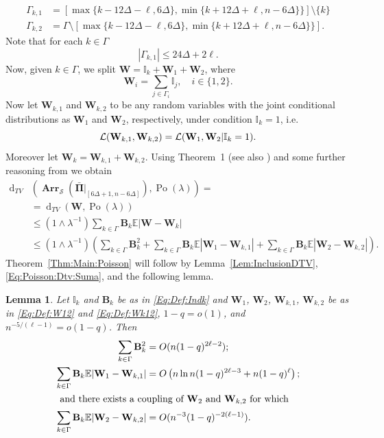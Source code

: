 \documentclass[letterpaper,11pt]{article}
\newtheorem{lemma}[theorem]{Lemma}
\theoremstyle{definition}
\theoremstyle{remark}
\renewcommand{\le}{\leqslant}
\newcommand{\bE}{\mathbb{E}}
\newcommand{\Arr}{\ensuremath{\operatorname{\mathbf{Arr}}}}
\newcommand{\bB}{\mathbf{B}}
\newcommand{\Ind}{\mathbb{I}}
\newcommand{\barPi}{\bar {\mathbf \Pi}}
\newcommand{\cS}{\mathcal{S}}
\newcommand{\dtv}{\operatorname{d}_{TV}}
\newcommand{\bW}{\mathbf{W}}
\begin{document}
\begin{align}
	\Gamma_{k,1}&=[\max\{k-12\Delta-\ell ,6\Delta\},\min\{k+12\Delta+\ell,n-6\Delta\}\}]\setminus \{k\}\nonumber \\
	\Gamma_{k,2}&=\Gamma\setminus [\max\{k-12\Delta-\ell,6\Delta\},\min\{k+12\Delta+\ell,n-6\Delta\}\}].\label{Eq:Def:Gammak}
\end{align}
Note that for each $k\in \Gamma$
\begin{equation*}
	|\Gamma_{k,1}|\le  24\Delta + 2\ell.
\end{equation*}
Now, given $k\in \Gamma$, we split $\bW=\Ind_k+\bW_1+\bW_2$, where
\begin{equation}\label{Eq:Def:W12}
	\bW_i=\sum_{j\in \Gamma_i}\Ind_j,\quad i\in \{1,2\}. 
\end{equation}
Now let $\bW_{k,1}$ and $\bW_{k,2}$ to be any random variables with the joint conditional distributions as $\bW_{1}$ and $\bW_{2}$, respectively, under condition $\Ind_{k}=1$, i.e.
\begin{equation}\label{Eq:Def:Wk12}
	{\cal L}(\bW_{k,1},\bW_{k,2})={\cal L}(\bW_{1},\bW_{2}|\Ind_{k}=1).
\end{equation}
Moreover let $\bW_k=\bW_{k,1}+\bW_{k,2}$.
Using Theorem~1 \cite{Janson1994} (see also \cite{BarbourHolstJansonBook}) and some further reasoning from \cite{Janson1994,BarbourHolstJansonBook}  we obtain 
\begin{align}\nonumber
	\dtv&\left(\Arr_{\cS}(\barPi|_{[6\Delta+1,n-6\Delta]}),\operatorname{Po}(\lambda)\right)=\\
	&=\dtv(\bW,\operatorname{Po}(\lambda))\\ \nonumber
	&\le (1\wedge \lambda^{-1})\sum_{k\in \Gamma}\bB_k\bE|\bW-\bW_k|\\
	&\le (1\wedge \lambda^{-1})
	\left(
	\sum_{k\in \Gamma}\bB_k^2
	+\sum_{k\in \Gamma}\bB_k\bE|\bW_1-\bW_{k,1}|
	+\sum_{k\in \Gamma}\bB_k\bE|\bW_2-\bW_{k,2}|
	\right)\label{Eq:Poisson:Dtv:Suma}.
\end{align}
Theorem~\ref{Thm:Main:Poisson} will follow by Lemma~\ref{Lem:InclusionDTV}, \eqref{Eq:Poisson:Dtv:Suma}, and the following lemma. 
\begin{lemma}\label{Lem:dtv:Coupling}
	Let $\Ind_k$ and $\bB_k$ be as in \eqref{Eq:Def:Indk} and $\bW_1$, $\bW_2$, $\bW_{k,1}$, $\bW_{k,2}$ be as in \eqref{Eq:Def:W12}  and  \eqref{Eq:Def:Wk12}, $1-q=o(1)$, and $ n^{-5/(\ell-1)}=o(1-q)$. Then
	\begin{align}
		\label{Eq:dtv:Coupling:1}	\sum_{k\in \Gamma}\bB_k^2&=O(n(1-q)^{2\ell-2});\\
		\label{Eq:dtv:Coupling:2}	\sum_{k\in \Gamma}\bB_k\bE|\bW_1-\bW_{k,1}|&=O\left(n\ln n(1-q)^{2\ell-3}+n(1-q)^{\ell}\right);\\
		\intertext{ and there exists a coupling of $\bW_2$ and $\bW_{k,2}$ for which}
		\label{Eq:dtv:Coupling:3}	\sum_{k\in \Gamma}\bB_k\bE|\bW_2-\bW_{k,2}|&=O(n^{-3}(1-q)^{-2(\ell-1)}).
	\end{align}	
\end{lemma}
\end{document}
